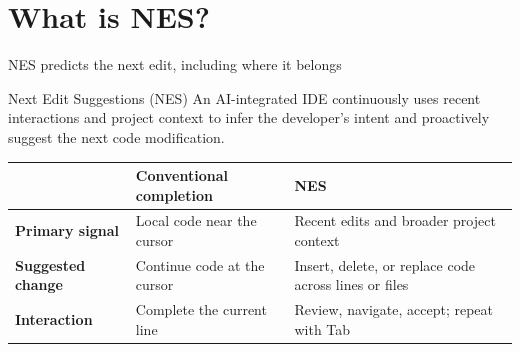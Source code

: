 \section{What is NES?}
\begin{frame}{NES predicts the next edit, including where it belongs}
\begin{block}{Next Edit Suggestions (NES)}
An AI-integrated IDE continuously uses recent interactions and project context to infer the developer's intent and proactively suggest the next code modification.
\end{block}
\par\vspace{3mm}
{\footnotesize
\setlength{\tabcolsep}{7pt}
\renewcommand{\arraystretch}{1.18}
\begin{tabularx}{\textwidth}{@{}>{\raggedright\arraybackslash}p{3.0cm}>{\raggedright\arraybackslash}X>{\raggedright\arraybackslash}X@{}}
\toprule
\rowcolor{BoxTitle}
 & \textcolor{BoxTitleText}{\textbf{Conventional completion}} & \textcolor{BoxTitleText}{\textbf{NES}}\\\midrule
\textbf{Primary signal} & Local code near the cursor & Recent edits and broader project context\\[7pt]
\textbf{Suggested change} & Continue code at the cursor & Insert, delete, or replace code across lines or files\\[7pt]
\textbf{Interaction} & Complete the current line & Review, navigate, accept; repeat with Tab\\\bottomrule
\end{tabularx}}\par
{}
\end{frame}

